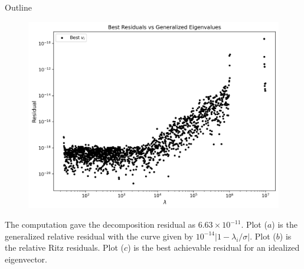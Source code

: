 \documentclass[landscape]{beamer}
\newcommand{\comm}[1]{\added[comment={#1}]{}}
\begin{document}
\begin{frame}[allowframebreaks]{Outline}
\begin{figure}
  	\vspace{2ex}  %
  	
  	\centering
  	\includegraphics[scale=.25]{./Plots/LU/residual_lu_bs.png}
  	\subcaption{}
  \end{figure}
 
  
  The computation gave the decomposition residual as $6.63 \times 10^{-11}$. Plot ($a$) is the generalized relative residual with the curve given by
  $10^{-14}|1-\lambda_i/\sigma|$. \comm{I don't see a curve here.  Just the points representing eigenvalue residuals.  The curves would be nice to see both here and in the thesis.  You can change the factor $10^{-14}$ to place the curve near the points but not covered by them.}  Plot ($b$) is the relative Ritz residuals. Plot ($c$) is the best achievable residual for an idealized eigenvector.
\end{frame}
\end{document}
